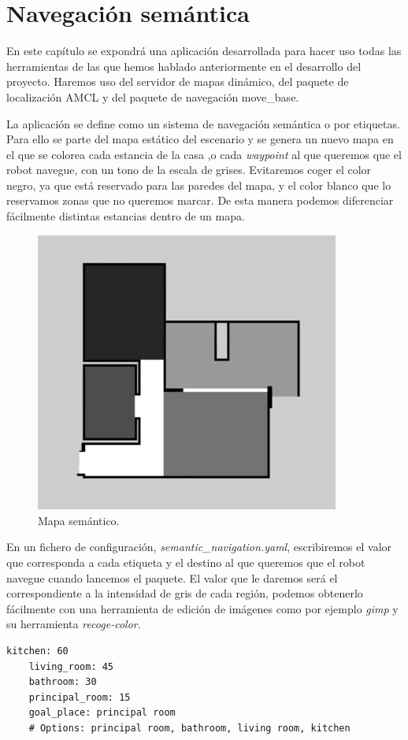 \chapter{Navegación semántica}
\label{cap:navegacionsemantica}
En este capítulo se expondrá una aplicación desarrollada para hacer uso todas las herramientas de las que hemos hablado anteriormente en el desarrollo del proyecto. Haremos uso del servidor de mapas dinámico, del paquete de localización AMCL y del paquete de navegación 
move\_base.

La aplicación se define como un sistema de navegación semántica o por etiquetas. Para ello se parte del mapa estático del escenario y se genera un nuevo mapa en el que se colorea cada estancia de la casa ,o cada \textit{waypoint} al que queremos que el robot navegue, con un tono de la escala de grises. Evitaremos coger el color negro, ya que está reservado para las paredes del mapa, y el color blanco que lo reservamos zonas que no queremos marcar. De esta manera podemos diferenciar fácilmente distintas estancias dentro de un mapa. 

\begin{figure} [hbtp]
  \begin{center}
    \includegraphics[width=10cm]{img/cap6/semanticmap}
  \end{center}
  \caption{Mapa semántico.}
  \label{fig:semanticmap}
\end{figure}

En un fichero de configuración, \textit{semantic\_navigation.yaml}, escribiremos el valor que corresponda a cada etiqueta y el destino al que queremos que el robot navegue cuando lancemos el paquete. El valor que le daremos será el correspondiente a la intensidad de gris de cada región, podemos obtenerlo fácilmente con una herramienta de edición de imágenes como por ejemplo \textit{gimp} y su herramienta \textit{recoge-color}.
\begin{lstlisting}[caption=Fichero de configuración de la navegación semántica, label={lst:semanticconfig}]
	kitchen: 60
	living_room: 45
	bathroom: 30
	principal_room: 15
	goal_place: principal room 
	# Options: principal room, bathroom, living room, kitchen
\end{lstlisting}

